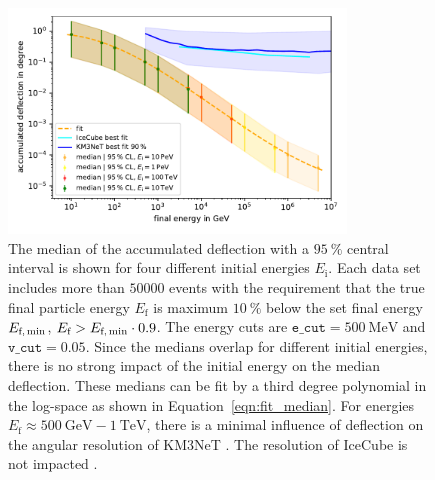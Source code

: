 \begin{figure}
    \centering 
    \includegraphics[width=0.8\textwidth]{figures/fit_median_defl_cut_10percent_only_poly.pdf}
    \caption{The median of the accumulated deflection with a $\SI{95}{\percent}$ 
    central interval is shown for four different initial energies $E_{\text{i}}$. 
    Each data set includes more than $\num{50000}$ events with the requirement 
    that the true final particle energy $E_{\text{f}}$ is maximum 
    $\SI{10}{\percent}$ below the set final energy $E_{\text{f,\,min}}$,   
    $E_{\text{f}} > E_{\text{f,\,min}} \cdot 0.9$. The energy cuts are $\texttt{e\_cut} = \SI{500}{\mega\electronvolt}$ and $\texttt{v\_cut} = 0.05$. 
    Since the medians overlap for different initial energies, there is no 
    strong impact of the initial energy on the median deflection. These 
    medians can be fit by a third degree polynomial in the log-space as 
    shown in Equation~\ref{eqn:fit_median}. For energies 
    $E_{\text{f}} \approx \SI{500}{\giga\electronvolt} - \SI{1}{\tera\electronvolt}$, there is a minimal influence of deflection on the angular resolution of 
    KM3NeT \cite{KM3NeT_Resolution2016}. The resolution of IceCube is not 
    impacted \cite{IceCube_Resolution2021}.}
    \label{fig:fit_median}
\end{figure}